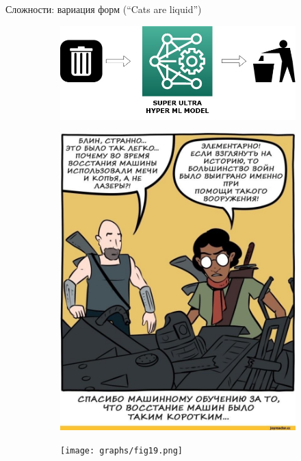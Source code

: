 \documentclass[aspectratio=169]{beamer}
\begin{document}
\begin{frame}{Сложности: вариация форм (``Cats are liquid'')}
    \begin{figure}
        \begin{subfigure}[b]{0.3\linewidth}
            \includegraphics[width=\linewidth]{graphs/fig17.jpg}
        \end{subfigure}
        \begin{subfigure}[b]{0.3\linewidth}
            \includegraphics[width=\linewidth]{graphs/fig18.jpg}
        \end{subfigure}
        \begin{subfigure}[b]{0.3\linewidth}
            \texttt{[image: graphs/fig19.png]}
        \end{subfigure}
    \end{figure}
\end{frame}
\end{document}
